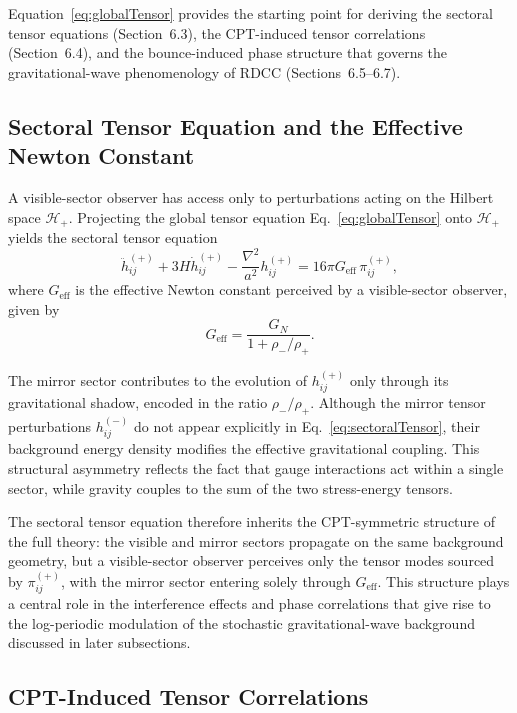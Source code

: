 \documentclass[11pt,a4paper]{article}
\begin{document}
Equation~\eqref{eq:globalTensor} provides the starting point for deriving the
sectoral tensor equations (Section~6.3), the CPT-induced tensor correlations
(Section~6.4), and the bounce-induced phase structure that governs the
gravitational-wave phenomenology of RDCC (Sections~6.5–6.7).

\subsection{Sectoral Tensor Equation and the Effective Newton Constant}

A visible-sector observer has access only to perturbations acting on the Hilbert
space \(\mathcal{H}_{+}\). Projecting the global tensor equation
Eq.~\eqref{eq:globalTensor} onto \(\mathcal{H}_{+}\) yields the sectoral tensor
equation
\begin{equation}
    \ddot{h}^{(+)}_{ij}
    + 3H\dot{h}^{(+)}_{ij}
    - \frac{\nabla^{2}}{a^{2}} h^{(+)}_{ij}
    = 16\pi G_{\mathrm{eff}}\,\pi^{(+)}_{ij},
    \label{eq:sectoralTensor}
\end{equation}
where \(G_{\mathrm{eff}}\) is the effective Newton constant perceived by a
visible-sector observer, given by
\begin{equation}
    G_{\mathrm{eff}}
    = \frac{G_{N}}{1 + \rho_{-}/\rho_{+}}.
\end{equation}

The mirror sector contributes to the evolution of \(h^{(+)}_{ij}\) only through
its gravitational shadow, encoded in the ratio \(\rho_{-}/\rho_{+}\). Although the
mirror tensor perturbations \(h^{(-)}_{ij}\) do not appear explicitly in
Eq.~\eqref{eq:sectoralTensor}, their background energy density modifies the
effective gravitational coupling. This structural asymmetry reflects the fact
that gauge interactions act within a single sector, while gravity couples to the
sum of the two stress-energy tensors.

The sectoral tensor equation therefore inherits the CPT-symmetric structure of
the full theory: the visible and mirror sectors propagate on the same background
geometry, but a visible-sector observer perceives only the tensor modes sourced
by \(\pi^{(+)}_{ij}\), with the mirror sector entering solely through
\(G_{\mathrm{eff}}\). This structure plays a central role in the interference
effects and phase correlations that give rise to the log-periodic modulation of
the stochastic gravitational-wave background discussed in later subsections.

\subsection{CPT-Induced Tensor Correlations}
\end{document}
